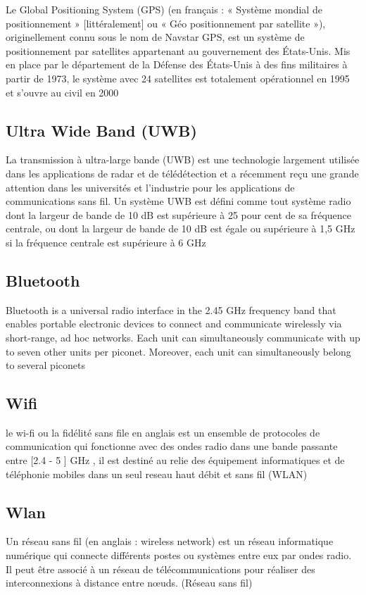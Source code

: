 \documentclass[12pt,a4paper]{report}
\begin{document}
Le Global Positioning System (GPS) (en français : « Système mondial de positionnement » [littéralement] ou « Géo positionnement par satellite »), originellement connu sous le nom de Navstar GPS, est un système de positionnement par satellites appartenant au gouvernement des États-Unis. Mis en place par le département de la Défense des États-Unis à des fins militaires à partir de 1973, le système avec 24 satellites est totalement opérationnel en 1995 et s'ouvre au civil en 2000\cite{gps}


\subsection{Ultra Wide Band (UWB)}

La transmission à ultra-large bande (UWB) est une technologie largement utilisée dans les applications de radar et de télédétection et a récemment reçu une grande attention dans les universités et l'industrie pour les applications de communications sans fil. Un système UWB est défini comme tout système radio dont la largeur de bande de 10 dB est supérieure à 25 pour cent de sa fréquence centrale, ou dont la largeur de bande de 10 dB est égale ou supérieure à 1,5 GHz si la fréquence centrale est supérieure à 6 GHz \cite{uwb}

\subsection{Bluetooth}

Bluetooth is a universal radio interface in the 2.45 GHz frequency band that enables portable electronic devices to connect and communicate wirelessly via short-range, ad hoc networks. Each unit can simultaneously communicate with up to seven other units per piconet. Moreover, each unit can simultaneously belong to several piconets \cite{bluetooth}

\subsection{Wifi}

le wi-fi ou la fidélité sans file en anglais est un ensemble de protocoles de communication qui fonctionne avec des ondes radio dans une bande passante entre [2.4 - 5 ] GHz , il est destiné au relie des équipement informatiques et de téléphonie mobiles dans un seul reseau haut débit et sans fil (WLAN)

\subsection{Wlan}
Un réseau sans fil (en anglais : wireless network) est un réseau informatique numérique qui connecte différents postes ou systèmes entre eux par ondes radio. Il peut être associé à un réseau de télécommunications pour réaliser des interconnexions à distance entre nœuds. (Réseau sans fil) \cite{wlan}
\end{document}
